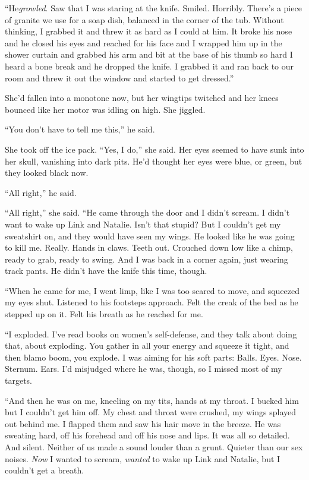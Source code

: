 ``He\dash{}\textit{growled}.  Saw that I was staring at the knife. 
Smiled.  Horribly.  There's a piece of granite we use for a soap dish,
balanced in the corner of the tub.  Without thinking, I grabbed it and
threw it as hard as I could at him.  It broke his nose and he closed
his eyes and reached for his face and I wrapped him up in the shower
curtain and grabbed his arm and bit at the base of his thumb so hard I
heard a bone break and he dropped the knife.  I grabbed it and ran
back to our room and threw it out the window and started to get
dressed.''

She'd fallen into a monotone now, but her wingtips twitched and her
knees bounced like her motor was idling on high.  She jiggled.

``You don't have to tell me this,'' he said.

She took off the ice pack.  ``Yes, I do,'' she said.  Her eyes seemed
to have sunk into her skull, vanishing into dark pits.  He'd thought
her eyes were blue, or green, but they looked black now.

``All right,'' he said.

``All right,'' she said.  ``He came through the door and I didn't
scream.  I didn't want to wake up Link and Natalie.  Isn't that
stupid?  But I couldn't get my sweatshirt on, and they would have seen
my wings.  He looked like he was going to kill me.  Really.  Hands in
claws.  Teeth out.  Crouched down low like a chimp, ready to grab,
ready to swing.  And I was back in a corner again, just wearing track
pants.  He didn't have the knife this time, though.

``When he came for me, I went limp, like I was too scared to move, and
squeezed my eyes shut.  Listened to his footsteps approach.  Felt the
creak of the bed as he stepped up on it.  Felt his breath as he
reached for me.

``I exploded.  I've read books on women's self-defense, and they talk
about doing that, about exploding.  You gather in all your energy and
squeeze it tight, and then blamo boom, you explode.  I was aiming for
his soft parts:  Balls.  Eyes.  Nose.  Sternum.  Ears.  I'd misjudged
where he was, though, so I missed most of my targets.

``And then he was on me, kneeling on my tits, hands at my throat.  I
bucked him but I couldn't get him off.  My chest and throat were
crushed, my wings splayed out behind me.  I flapped them and saw his
hair move in the breeze.  He was sweating hard, off his forehead and
off his nose and lips.  It was all so detailed.  And silent.  Neither
of us made a sound louder than a grunt.  Quieter than our sex noises. 
\textit{Now} I wanted to scream, \textit{wanted} to wake up Link and
Natalie, but I couldn't get a breath.

